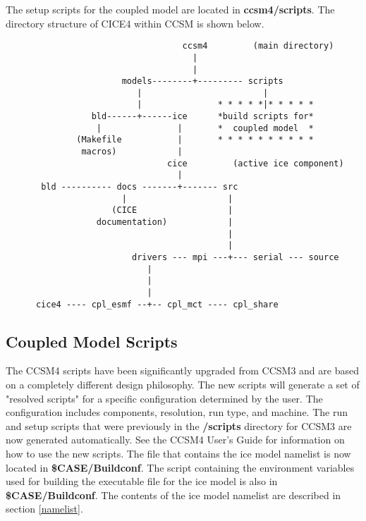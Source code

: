 
The setup scripts for the coupled model are 
located in {\bf ccsm4/scripts}. The directory structure of CICE4
within CCSM is shown below.

\begin{verbatim}
                                   ccsm4         (main directory)
                                     |
                                     |
                       models--------+--------- scripts
                          |                        |
                          |               * * * * *|* * * * * 
                 bld------+------ice      *build scripts for*
                  |               |       *  coupled model  *
              (Makefile           |       * * * * * * * * * *
               macros)            |
                                cice         (active ice component)
                                  |
       bld ---------- docs -------+------- src
                       |                    |
                     (CICE                  |
                  documentation)            |
                                            |
                                            |                  
                         drivers --- mpi ---+--- serial --- source
                            | 
                            |
                            |
      cice4 ---- cpl_esmf --+-- cpl_mct ---- cpl_share

\end{verbatim}

\subsection{Coupled Model Scripts}
\label{coupled_scripts}

The CCSM4 scripts have been significantly upgraded from CCSM3 and are
based on a completely different design philosophy.  The new scripts will
generate a set of "resolved scripts" for a specific configuration determined
by the user. The configuration includes components, resolution, run type, and
machine. The run and setup scripts that were previously in the {\bf /scripts}
directory for CCSM3 are now generated automatically.  See the CCSM4 User's 
Guide for information on how to use the new scripts.  The file that contains 
the ice model namelist is now located in {\bf \$CASE/Buildconf}. The
script containing the environment variables used for building the executable
file for the ice model is also in {\bf \$CASE/Buildconf}.
The contents of the ice model namelist are described in section \ref{namelist}.
